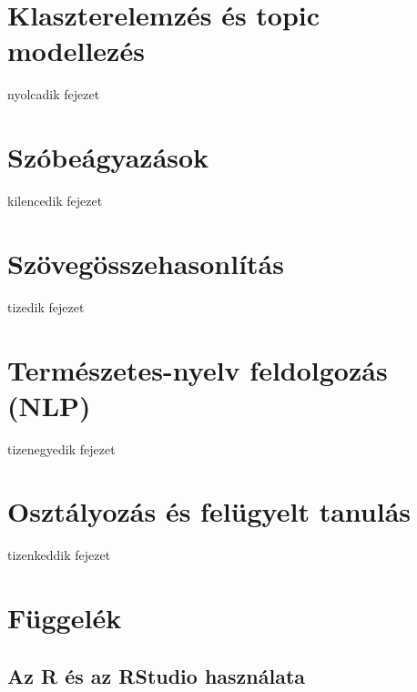 \documentclass[
]{book}
\begin{document}
\hypertarget{klaszterelemzuxe9s-uxe9s-topic-modellezuxe9s}{%
\chapter{Klaszterelemzés és topic
modellezés}\label{klaszterelemzuxe9s-uxe9s-topic-modellezuxe9s}}

nyolcadik fejezet

\hypertarget{szuxf3beuxe1gyazuxe1sok}{%
\chapter{Szóbeágyazások}\label{szuxf3beuxe1gyazuxe1sok}}

kilencedik fejezet

\hypertarget{szuxf6veguxf6sszehasonluxedtuxe1s}{%
\chapter{Szövegösszehasonlítás}\label{szuxf6veguxf6sszehasonluxedtuxe1s}}

tizedik fejezet

\hypertarget{termuxe9szetes-nyelv-feldolgozuxe1s-nlp}{%
\chapter{Természetes-nyelv feldolgozás
(NLP)}\label{termuxe9szetes-nyelv-feldolgozuxe1s-nlp}}

tizenegyedik fejezet

\hypertarget{osztuxe1lyozuxe1s-uxe9s-feluxfcgyelt-tanuluxe1s}{%
\chapter{Osztályozás és felügyelt
tanulás}\label{osztuxe1lyozuxe1s-uxe9s-feluxfcgyelt-tanuluxe1s}}

tizenkeddik fejezet

\hypertarget{fuxfcggeluxe9k}{%
\chapter{Függelék}\label{fuxfcggeluxe9k}}

\hypertarget{az-r-uxe9s-az-rstudio-hasznuxe1lata}{%
\section{Az R és az RStudio
használata}\label{az-r-uxe9s-az-rstudio-hasznuxe1lata}}
\end{document}
